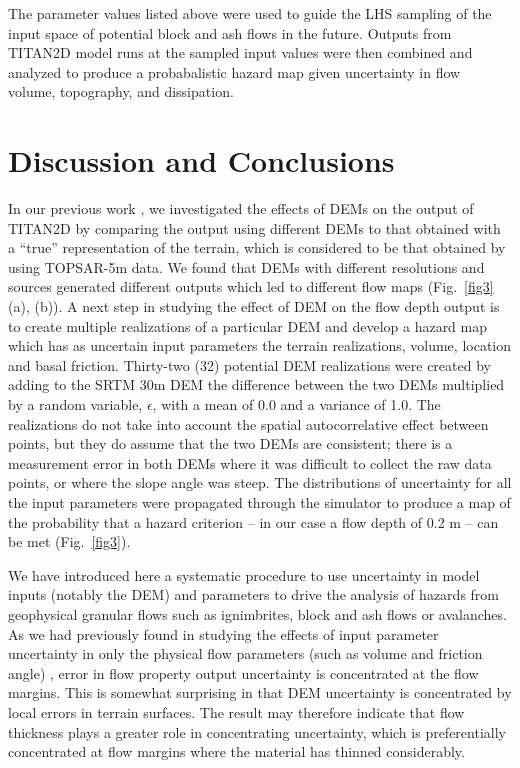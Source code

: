 \documentclass[a4paper,fleqn]{article}
\begin{document}
The parameter values listed above were used to guide the LHS sampling
of the input space of potential block and ash flows in the future.
Outputs from TITAN2D model runs at the sampled input values were then
combined and analyzed to produce a probabalistic hazard map given
uncertainty in flow volume, topography, and dissipation.



\section{Discussion and Conclusions}

In our previous work \citep{stefanescu1}, we investigated the effects
of DEMs on the output of TITAN2D by comparing the output using
different DEMs to that obtained with a ``true'' representation of the
terrain, which is considered to be that obtained by using TOPSAR-5m
data.  We found that DEMs with different resolutions and sources
generated different outputs which led to different flow maps
(Fig.~\ref{fig3} (a), (b)).  A next step in studying the effect of DEM
on the flow depth output is to create multiple realizations of a
particular DEM and develop a hazard map which has as uncertain input
parameters the terrain realizations, volume, location and basal
friction.
Thirty-two (32) potential DEM realizations were created by adding to
the SRTM 30m DEM the difference between the two DEMs multiplied by a
random variable, $\epsilon$, with a mean of 0.0 and a variance of 1.0.
The realizations do not take into account the spatial autocorrelative
effect between points, but they do assume that the two DEMs are
consistent; there is a measurement error in both DEMs where it was
difficult to collect the raw data points, or where the slope angle was
steep. The distributions of uncertainty for all the input parameters
were propagated through the simulator to produce a map of the
probability that a hazard criterion -- in our case a flow depth of 0.2
m -- can be met (Fig.~\ref{fig3}).

We have introduced here a systematic procedure to use uncertainty in
model inputs (notably the DEM) and parameters to drive the analysis of
hazards from geophysical granular flows such as ignimbrites, block and
ash flows or avalanches.  As we had previously found in studying the
effects of input parameter uncertainty in only the physical flow
parameters (such as volume and friction angle) \citep{Keith}, error in
flow property output uncertainty is concentrated at the flow margins.
This is somewhat surprising in that DEM uncertainty is concentrated by
local errors in terrain surfaces.  The result may therefore indicate
that flow thickness plays a greater role in concentrating uncertainty,
which is preferentially concentrated at flow margins where the
material has thinned considerably.
\end{document}
